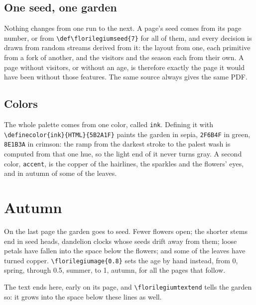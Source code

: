 \documentclass[11pt,a4paper]{article}
\newcommand\code[1]{\texttt{\small #1}}
\begin{document}
\subsection{One seed, one garden}

Nothing changes from one run to the next. A page's seed comes from its page number, or
from \code{\textbackslash def\textbackslash florilegiumseed\{7\}} for all of them, and
every decision is drawn from random streams derived from it: the layout from one, each
primitive from a fork of another, and the visitors and the season each from their own.
A page without visitors, or without an age, is therefore exactly the page it would have
been without those features. The same source always gives the same PDF.

\subsection{Colors}

The whole palette comes from one color, called \code{ink}. Defining it with
\code{\textbackslash definecolor\{ink\}\{HTML\}\{5B2A1F\}} paints the garden in sepia, \code{2F6B4F} in green, \code{8E1B3A} in crimson: the ramp from
the darkest stroke to the palest wash is computed from that one hue, so the light end of
it never turns gray. A second color, \code{accent}, is the copper of the hairlines, the
sparkles and the flowers' eyes, and in autumn of some of the leaves.

\section{Autumn}

On the last page the garden goes to seed. Fewer flowers open; the shorter stems end in
seed heads, dandelion clocks whose seeds drift away from them; loose petals have fallen
into the space below the flowers; and some of the leaves have turned copper.
\code{\textbackslash florilegiumage\{0.8\}} sets the age by hand instead, from 0, spring,
through 0.5, summer, to 1, autumn, for all the pages that follow.

The text ends here, early on its page, and \code{\textbackslash florilegiumtextend} tells
the garden so: it grows into the space below these lines as well.
\florilegiumtextend
\end{document}
